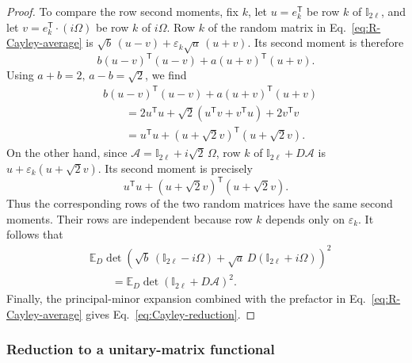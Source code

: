 \documentclass[prx,twocolumn,superscriptaddress,aps,10pt, frontmatterverbose, reprint,footinbib,longbibliography=true]{revtex4-2}
\newcommand{\trans}{\mathsf{T}}
\begin{document}
\begin{proof}
To compare the row second moments, fix $k$, let $u=e_k^{\trans}$
be row $k$ of $\mathbb{I}_{2\ell}$, and let $v=e_k^\trans\cdot(i\Omega)$ be
row $k$ of $i\Omega$. Row $k$ of the random matrix in
Eq.~\eqref{eq:R-Cayley-average} is $\sqrt{b}\,(u-v)+\varepsilon_k\sqrt{a}\,(u+v)$.
Its second moment is therefore
\begin{equation}
    b(u-v)^{\trans}(u-v)+a(u+v)^{\trans}(u+v).
\end{equation}
Using $a+b=2,\, a-b=\sqrt{2}$, we find
\begin{equation}
    \begin{aligned}
&b(u-v)^{\trans}(u-v)+a(u+v)^{\trans}(u+v)\\
&\qquad=
2u^{\trans}u
+\sqrt{2}\left(u^{\trans}v+v^{\trans}u\right)
+2v^{\trans}v\\
&\qquad=
u^{\trans}u+
(u+\sqrt{2}v)^{\trans}(u+\sqrt{2}v).
\end{aligned}
\end{equation}
On the other hand, since
$\mathcal{A}=\mathbb{I}_{2\ell}+i\sqrt{2}\,\Omega$, row $k$ of
$\mathbb{I}_{2\ell}+D\mathcal{A}$ is $u+\varepsilon_k(u+\sqrt{2}v)$.
Its second moment is precisely
\begin{equation}
    u^{\trans}u+(u+\sqrt{2}v)^{\trans}(u+\sqrt{2}v).
\end{equation}
Thus the corresponding rows of the two random matrices have the
same second moments. Their rows are independent because row $k$
depends only on $\varepsilon_k$. It follows that
\begin{equation}
    \begin{aligned}
&\mathbb{E}_D
\det\!\left(
\sqrt{b}\,(\mathbb{I}_{2\ell}-i\Omega)
+\sqrt{a}\,D(\mathbb{I}_{2\ell}+i\Omega)
\right)^2\\
&\qquad=
\mathbb{E}_D\det(\mathbb{I}_{2\ell}+D\mathcal{A})^2.
\end{aligned}
\end{equation}
Finally, the principal-minor expansion combined with the prefactor in Eq.~\eqref{eq:R-Cayley-average} gives Eq.~\eqref{eq:Cayley-reduction}.
\end{proof}

\subsubsection{ Reduction to a unitary-matrix functional }
\label{app:proof:graph}
\end{document}
